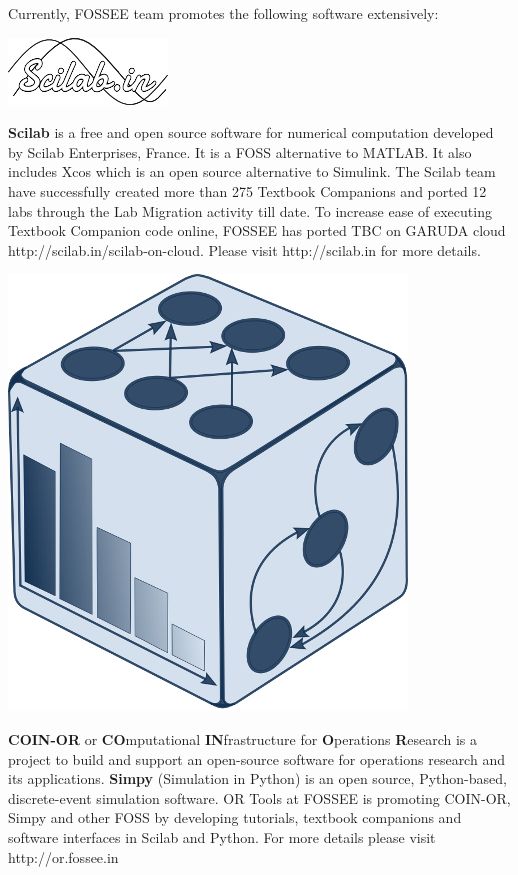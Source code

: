 \documentclass{letter}
\begin{document}
\newpage 
Currently, FOSSEE team promotes the following software extensively: \\

\begin{minipage}[t]{0.48\linewidth} \begin{center}
\includegraphics[width=0.7\linewidth]{images/scilab_logo.png} \end{center}
\textbf{Scilab} is a free and open source software for numerical computation
developed by Scilab Enterprises, France. It is a FOSS alternative to MATLAB.
It also includes Xcos which is an open source alternative to Simulink. The
Scilab team have successfully created more than 275 Textbook Companions and
ported 12 labs through the Lab Migration activity till date. To increase ease
of executing Textbook Companion code online, FOSSEE has ported TBC on GARUDA
cloud {\color{blue}http://scilab.in/scilab-on-cloud}. Please visit {\color{blue}http://scilab.in} for
more details.  \end{minipage} \hspace{0.04\linewidth}
\begin{minipage}[t]{0.48\linewidth} \begin{center}
\includegraphics[width=0.25\linewidth]{images/coin_logo.png} \end{center}
\textbf{COIN-OR} or \textbf{CO}mputational \textbf{IN}frastructure for
\textbf{O}perations \textbf{R}esearch is a project to build and support an
open-source software for operations research and its applications.
\textbf{Simpy} (Simulation in Python) is an open source, Python-based,
discrete-event simulation software. OR Tools at FOSSEE is promoting COIN-OR,
Simpy and other FOSS by developing tutorials, textbook companions and software
interfaces in Scilab and Python. For more details please visit
{\color{blue}http://or.fossee.in} \end{minipage}
\end{document}
